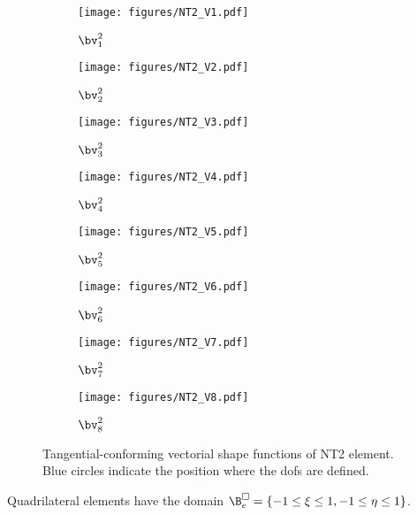 \begin{figure}[ht]
     \begin{subfigure}[b]{0.32\textwidth}
         \centering
         \texttt{[image: figures/NT2\_V1.pdf]}
        \caption{$\bv	^2_1$}
     \end{subfigure}
     \begin{subfigure}[b]{0.32\textwidth}
         \centering
         \texttt{[image: figures/NT2\_V2.pdf]}
  \caption{$\bv^2_2$}
     \end{subfigure}
          \begin{subfigure}[b]{0.32\textwidth}
         \centering
         \texttt{[image: figures/NT2\_V3.pdf]}
  \caption{$\bv^2_3$}
     \end{subfigure}
          \begin{subfigure}[b]{0.32\textwidth}
         \centering
         \texttt{[image: figures/NT2\_V4.pdf]}
        \caption{$\bv^2_4$}
     \end{subfigure}
     \begin{subfigure}[b]{0.32\textwidth}
         \centering
         \texttt{[image: figures/NT2\_V5.pdf]}
  \caption{$\bv^2_5$}
     \end{subfigure}
          \begin{subfigure}[b]{0.32\textwidth}
         \centering
         \texttt{[image: figures/NT2\_V6.pdf]}
  \caption{$\bv^2_6$}
     \end{subfigure}
          \begin{subfigure}[b]{0.32\textwidth}
         \centering
         \texttt{[image: figures/NT2\_V7.pdf]}
        \caption{$\bv^2_7$}
     \end{subfigure}
  \begin{subfigure}[b]{0.32\textwidth}
         \centering
         \texttt{[image: figures/NT2\_V8.pdf]}
        \caption{$\bv^2_8$}
     \end{subfigure}
       \caption{Tangential-conforming vectorial shape functions of NT2 element. Blue circles indicate the position where the dofs are defined. }
        \label{Fig:shape_function_NT2}
\end{figure}

 Quadrilateral elements have the domain $\B_e^\square = \{-1 \le \xi \le 1, -1 \le \eta \le 1\}$. 

